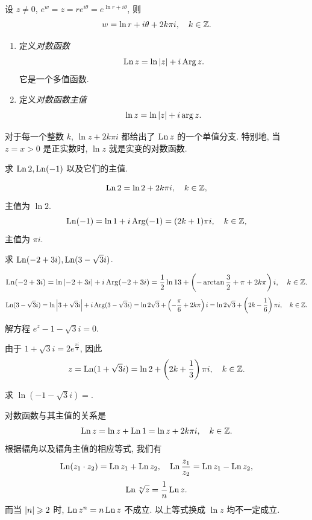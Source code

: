 设 $z\neq 0$, $e^w=z=re^{i\theta}=e^{\ln r+i\theta}$,
则
\[w=\ln r+i\theta+2k\pi i,\quad k\in{\mathbb{Z}}.\]
\begin{definition}[对数函数]
	\begin{enumerate}
		\item 定义\emph{对数函数}
			\[\operatorname{Ln} z=\ln\left|z\right|+i\operatorname{Arg} z.\]
			它是一个多值函数.
		\item 定义\emph{对数函数主值}
			\[\ln z=\ln\left|z\right|+i\arg z.\]
	\end{enumerate}
\end{definition}
对于每一个整数 $k$, $\ln z+2k\pi i$ 都给出了 $\operatorname{Ln} z$ 的一个单值分支.
特别地, 当 $z=x>0$ 是正实数时, $\ln z$ 就是实变的对数函数.

\begin{example}
	求 $\operatorname{Ln} 2,\operatorname{Ln}(-1)$ 以及它们的主值.
\end{example}

\begin{solution}
	\[\operatorname{Ln}2=\ln2+2k\pi i,\quad k\in{\mathbb{Z}},\]
	主值为 $\ln 2$.
	\[\operatorname{Ln}(-1)=\ln1+i\operatorname{Arg}(-1)=(2k+1)\pi i,\quad k\in{\mathbb{Z}},\]
	主值为 $\pi i$.
\end{solution}

\begin{example}
求 $\operatorname{Ln}(-2+3i),\operatorname{Ln}(3-\sqrt3 i)$.
\end{example}

\begin{solution}
	\[
    \operatorname{Ln}(-2+3i)=\ln\left|-2+3i\right|+i\operatorname{Arg}(-2+3i)
      =\frac 12\ln 13+\left(-\arctan\frac 32+\pi+2k\pi\right)i,
      \quad k\in{\mathbb{Z}}.
  \]
	\[
    \operatorname{Ln}(3-\sqrt3i)=\ln\left|3+\sqrt 3i\right|+i\operatorname{Arg}(3-\sqrt 3i)
      =\ln 2\sqrt 3+\left(-\frac\pi6+2k\pi\right)i
      =\ln 2\sqrt 3+\left(2k-\frac16\right)\pi i,
      \quad k\in{\mathbb{Z}}.
  \]
\end{solution}

\begin{example}
	解方程 $e^z-1-\sqrt 3i=0$.
\end{example}

\begin{solution}
	由于 $1+\sqrt 3 i=2e^{\frac{\pi i}3}$, 因此
	\[z=\operatorname{Ln}(1+\sqrt 3i)=\ln 2+\left(2k+\frac13\right)\pi i,\quad k\in{\mathbb{Z}}.\]
\end{solution}

\begin{exercise}
	求 $\ln(-1-\sqrt3 i)=$\fillblank[2cm][3mm]{}.
\end{exercise}

对数函数与其主值的关系是
\[\operatorname{Ln} z=\ln z+\operatorname{Ln} 1=\ln z+2k\pi i,\quad k\in{\mathbb{Z}}.\]
根据辐角以及辐角主值的相应等式, 我们有
\[\operatorname{Ln}(z_1\cdot z_2)=\operatorname{Ln} z_1+\operatorname{Ln} z_2,\quad
  \operatorname{Ln}\frac{z_1}{z_2}=\operatorname{Ln} z_1-\operatorname{Ln} z_2,\]
\[\operatorname{Ln} \sqrt[n]z=\dfrac1n\operatorname{Ln} z.\]
而当 $\left|n\right|\geqslant 2$ 时, \alert{$\operatorname{Ln} z^n=n\operatorname{Ln} z$ 不成立}.
以上等式换成 $\ln z$ 均不一定成立.


